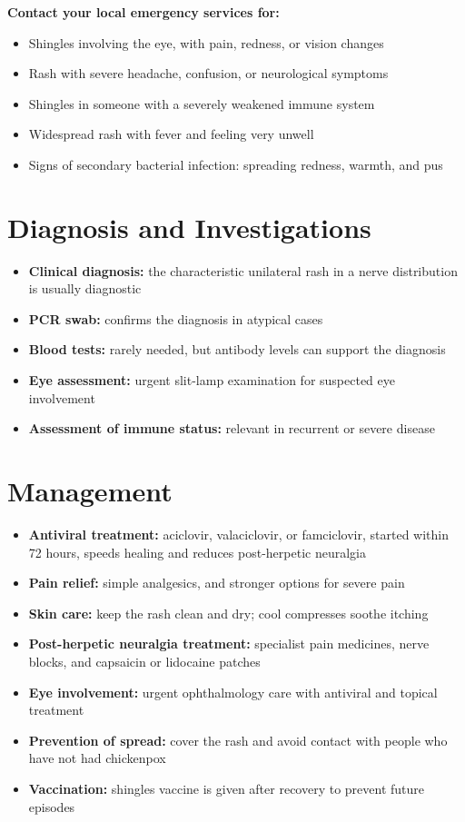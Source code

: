 \textbf{Contact your local emergency services for:}
\begin{itemize}
    \item Shingles involving the eye, with pain, redness, or vision changes
    \item Rash with severe headache, confusion, or neurological symptoms
    \item Shingles in someone with a severely weakened immune system
    \item Widespread rash with fever and feeling very unwell
    \item Signs of secondary bacterial infection: spreading redness, warmth, and pus
\end{itemize}

\section*{Diagnosis and Investigations}
\begin{itemize}
    \item \textbf{Clinical diagnosis:} the characteristic unilateral rash in a nerve distribution is usually diagnostic
    \item \textbf{PCR swab:} confirms the diagnosis in atypical cases
    \item \textbf{Blood tests:} rarely needed, but antibody levels can support the diagnosis
    \item \textbf{Eye assessment:} urgent slit-lamp examination for suspected eye involvement
    \item \textbf{Assessment of immune status:} relevant in recurrent or severe disease
\end{itemize}

\section*{Management}
\begin{itemize}
    \item \textbf{Antiviral treatment:} aciclovir, valaciclovir, or famciclovir, started within 72 hours, speeds healing and reduces post-herpetic neuralgia
    \item \textbf{Pain relief:} simple analgesics, and stronger options for severe pain
    \item \textbf{Skin care:} keep the rash clean and dry; cool compresses soothe itching
    \item \textbf{Post-herpetic neuralgia treatment:} specialist pain medicines, nerve blocks, and capsaicin or lidocaine patches
    \item \textbf{Eye involvement:} urgent ophthalmology care with antiviral and topical treatment
    \item \textbf{Prevention of spread:} cover the rash and avoid contact with people who have not had chickenpox
    \item \textbf{Vaccination:} shingles vaccine is given after recovery to prevent future episodes
\end{itemize}

